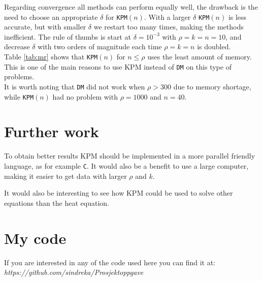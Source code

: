 Regarding convergence all methods can perform equally well, the drawback is the need to choose an appropriate $\delta$ for \texttt{KPM}$(n)$. With a larger $\delta$ \texttt{KPM}$(n)$ is less accurate, but with smaller $\delta$ we restart too many times, making the methods inefficient. The rule of thumbs is start at $\delta=10^{-3}$ with $\rho = k = n = 10$, and decrease $\delta$ with two orders of magnitude each time $\rho = k = n$ is doubled. \\



Table \ref{tab:mr} shows that \texttt{KPM}$(n)$ for $n \leq \rho$ uses the least amount of memory. This is one of the main reasons to use KPM instead of \texttt{DM} on this type of problems. \\

It is worth noting that \texttt{DM} did not work when $\rho>300$ due to memory shortage, while \texttt{KPM}$(n)$ had no problem with $\rho = 1000$ and $n = 40$. \\

\chapter*{Further work}%
To obtain better results KPM should be implemented in a more parallel friendly language, as for example \texttt{C}. It would also be a benefit to use a large computer, making it easier to get data with larger $\rho$ and $k$.

It would also be interesting to see how KPM could be used to solve other equations than the heat equation.
\chapter*{My code}%

If you are interested in any of the code used here you can find it at: \\
\emph{https://github.com/sindreka/Prosjektoppgave}
